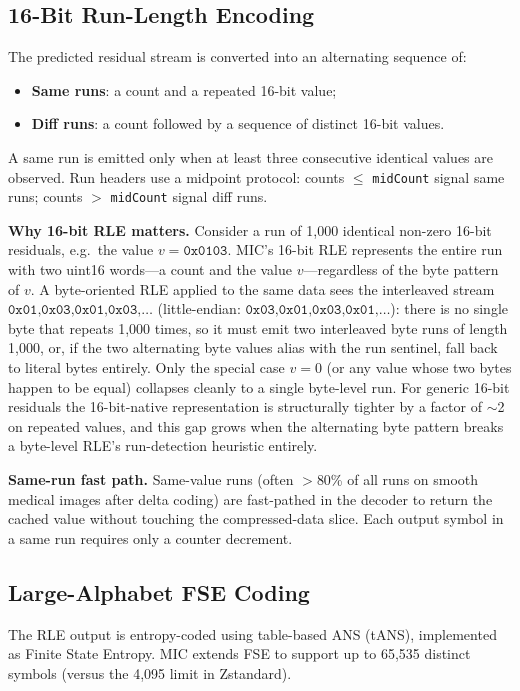 \documentclass[journal]{IEEEtran}
\begin{document}
\subsection{16-Bit Run-Length Encoding}

The predicted residual stream is converted into an alternating sequence of:
\begin{itemize}
  \item \textbf{Same runs}: a count and a repeated 16-bit value;
  \item \textbf{Diff runs}: a count followed by a sequence of distinct 16-bit
  values.
\end{itemize}

A same run is emitted only when at least three consecutive identical values are
observed. Run headers use a midpoint protocol: counts $\leq$ \texttt{midCount}
signal same runs; counts $>$ \texttt{midCount} signal diff runs.

\textbf{Why 16-bit RLE matters.} Consider a run of 1,000 identical non-zero
16-bit residuals, e.g.\ the value $v = \texttt{0x0103}$. MIC's 16-bit RLE
represents the entire run with two uint16 words---a count and the value
$v$---regardless of the byte pattern of $v$. A byte-oriented RLE applied to the
same data sees the interleaved stream $\texttt{0x01,0x03,0x01,0x03,\ldots}$
(little-endian: $\texttt{0x03,0x01,0x03,0x01,\ldots}$): there is no single
byte that repeats 1,000 times, so it must emit two interleaved byte runs of
length 1,000, or, if the two alternating byte values alias with the run
sentinel, fall back to literal bytes entirely. Only the special case $v = 0$
(or any value whose two bytes happen to be equal) collapses cleanly to a
single byte-level run. For generic 16-bit residuals the 16-bit-native
representation is structurally tighter by a factor of $\sim$2 on repeated
values, and this gap grows when the alternating byte pattern breaks a
byte-level RLE's run-detection heuristic entirely.

\textbf{Same-run fast path.} Same-value runs (often $>$80\% of all runs on
smooth medical images after delta coding) are fast-pathed in the decoder to
return the cached value without touching the compressed-data slice. Each output
symbol in a same run requires only a counter decrement.

\subsection{Large-Alphabet FSE Coding}

The RLE output is entropy-coded using table-based ANS (tANS), implemented as
Finite State Entropy. MIC extends FSE to support up to 65,535 distinct symbols
(versus the 4,095 limit in Zstandard).
\end{document}
